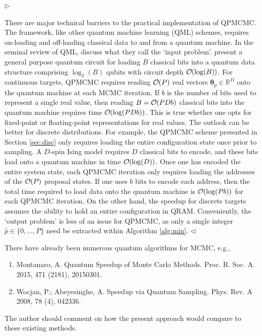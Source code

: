 \documentclass[12pt]{article}
\newenvironment{reply}{$\triangleright$\bfseries}{$\triangleleft$}
\renewenvironment{quote}
               {\list{}{\rightmargin\leftmargin}%
                \item\relax\normalfont}
               {\endlist}
\newcommand{\order}[1]{{\cal O}\hspace{-0.2em}\left( #1 \right)}
\newcommand{\ttheta}{\boldsymbol{\theta}}
\begin{document}
\begin{reply}
	\begin{quote}
There are major technical barriers to the practical implementation of QPMCMC.  The framework, like other quantum machine learning (QML) schemes, requires on-loading and off-loading classical data to and from a quantum machine.  In the seminal review of QML, \citet{biamonte2017quantum} discuss what they call the `input problem'.  \citet{cortese2018loading} present a general purpose quantum circuit for loading $B$ classical bits into a quantum data structure comprising $\log_2 (B)$ qubits with circuit depth $\order{\log (B)}$.  For continuous targets, QPMCMC requires reading $\order{P}$ real vectors $\ttheta_p\in \mathbb{R}^D$ onto the quantum machine at each MCMC iteration.  If $b$ is the number of bits used to represent a single real value, then reading $B=\order{PDb}$ classical bits into the quantum machine requires time $\order{\log (PDb)}$.  This is true whether one opts for fixed-point \citep{jordan2005fast} or floating-point \citep{haener2018quantum} representations for real values.  The outlook can be better for discrete distributions.  For example, the QPMCMC scheme presented in Section \ref{sec:disc} only requires loading the entire configuration state once prior to sampling.  A $D$-spin Ising model requires $D$ classical bits to encode, and these bits load onto a quantum machine in time $\order{\log(D)}$.  Once one has encoded the entire system state, each QPMCMC iteration only requires loading the addresses of the $\order{P}$ proposal states. If one uses $b$ bits to encode each address, then the total time required to load data onto the quantum machine is $\order{\log(Pb)}$ for each QPMCMC iteration.  On the other hand, the speedup for discrete targets assumes the ability to hold an entire configuration in QRAM.
Conveniently, the `output problem' is less of an issue for QPMCMC, as only a single integer $\hat{p} \in \{0,\dots,P\}$ need be extracted within Algorithm \ref{alg:min}.
	\end{quote}
\end{reply}

There have already been numerous quantum algorithms for MCMC, e.g.,
\begin{enumerate}
	\item Montanaro, A. Quantum Speedup of Monte Carlo Methods. Proc. R. Soc. A. 2015, 471 (2181), 20150301. \citep{montanaro}
	
	\item Wocjan, P.; Abeyesinghe, A. Speedup via Quantum Sampling. Phys. Rev. A 2008, 78 (4), 042336. \citep{wocjan2008speedup}
\end{enumerate}
The author should comment on how the present approach would compare to these existing methods.
\end{document}
